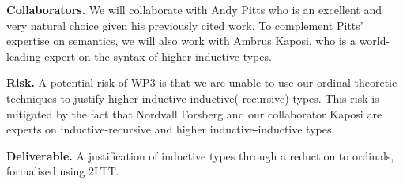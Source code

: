 \documentclass[a4paper,11pt]{article}
\renewcommand{\paragraph}[1]{\textbf{#1.}}
\begin{document}

\paragraph{Collaborators}
We will collaborate with Andy Pitts who is an excellent and very natural choice given his previously cited work. To complement Pitts' expertise on semantics, we will also work with Ambrus Kaposi, who is a world-leading expert on the syntax of higher inductive types.

\paragraph{Risk}
A potential risk of WP3 is that we are unable to use our ordinal-theoretic techniques to justify higher inductive-inductive(-recursive) types. This risk is mitigated by the fact that Nordvall Forsberg and our collaborator Kaposi are experts on inductive-recursive and higher inductive-inductive types.

\paragraph{Deliverable} %
A justification of inductive types through a reduction to ordinals, formalised using 2LTT.
\end{document}
